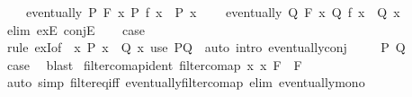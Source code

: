\begin{isabellebody}
\ \ \ \ {\isachardoublequoteopen}eventually\ P{\isacharprime}{\kern0pt}\ F{\isachardoublequoteclose}\ {\isachardoublequoteopen}{\isasymforall}x{\isachardot}{\kern0pt}\ P{\isacharprime}{\kern0pt}\ {\isacharparenleft}{\kern0pt}f\ x{\isacharparenright}{\kern0pt}\ {\isasymlongrightarrow}\ P\ x{\isachardoublequoteclose}\isanewline
\ \ \ \ {\isachardoublequoteopen}eventually\ Q{\isacharprime}{\kern0pt}\ F{\isachardoublequoteclose}\ {\isachardoublequoteopen}{\isasymforall}x{\isachardot}{\kern0pt}\ Q{\isacharprime}{\kern0pt}\ {\isacharparenleft}{\kern0pt}f\ x{\isacharparenright}{\kern0pt}\ {\isasymlongrightarrow}\ Q\ x{\isachardoublequoteclose}\isanewline
\ \ \ \ \isamarkupfalse%
\ {\isacharparenleft}{\kern0pt}elim\ exE\ conjE{\isacharparenright}{\kern0pt}\isanewline
\ \ \isamarkupfalse%
\ {\isacharquery}{\kern0pt}case\isanewline
\ \ \ \ \isamarkupfalse%
\ {\isacharparenleft}{\kern0pt}rule\ exI{\isacharbrackleft}{\kern0pt}of\ {\isacharunderscore}{\kern0pt}\ {\isachardoublequoteopen}{\isasymlambda}x{\isachardot}{\kern0pt}\ P{\isacharprime}{\kern0pt}\ x\ {\isasymand}\ Q{\isacharprime}{\kern0pt}\ x{\isachardoublequoteclose}{\isacharbrackright}{\kern0pt}{\isacharparenright}{\kern0pt}\ {\isacharparenleft}{\kern0pt}use\ P{\isacharprime}{\kern0pt}Q{\isacharprime}{\kern0pt}\ \ {\isacartoucheopen}auto\ intro{\isacharbang}{\kern0pt}{\isacharcolon}{\kern0pt}\ eventually{\isacharunderscore}{\kern0pt}conj{\isacartoucheclose}{\isacharparenright}{\kern0pt}\isanewline
{}\isamarkupfalse%
\isanewline
\ \ \isamarkupfalse%
\ {\isacharparenleft}{\kern0pt}{}\ P\ Q{\isacharparenright}{\kern0pt}\isanewline
\ \ \isamarkupfalse%
\ {\isacharquery}{\kern0pt}case\ \isamarkupfalse%
\ blast\isanewline
{}\isamarkupfalse%
%
\endisatagproof
{\isafoldproof}%
%
\isadelimproof
\isanewline
%
\endisadelimproof
\isanewline
{}\isamarkupfalse%
\ filtercomap{\isacharunderscore}{\kern0pt}ident{\isacharcolon}{\kern0pt}\ {\isachardoublequoteopen}filtercomap\ {\isacharparenleft}{\kern0pt}{\isasymlambda}x{\isachardot}{\kern0pt}\ x{\isacharparenright}{\kern0pt}\ F\ {\isacharequal}{\kern0pt}\ F{\isachardoublequoteclose}\isanewline
%
\isadelimproof
\ \ %
\endisadelimproof
%
\isatagproof
{}\isamarkupfalse%
\ {\isacharparenleft}{\kern0pt}auto\ simp{\isacharcolon}{\kern0pt}\ filter{\isacharunderscore}{\kern0pt}eq{\isacharunderscore}{\kern0pt}iff\ eventually{\isacharunderscore}{\kern0pt}filtercomap\ elim{\isacharbang}{\kern0pt}{\isacharcolon}{\kern0pt}\ eventually{\isacharunderscore}{\kern0pt}mono{\isacharparenright}{\kern0pt}%

\end{isabellebody}
